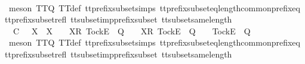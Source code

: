 \begin{isabellebody}
\ \ \ \ \ \ \isamarkupfalse%
\ {\isacharparenleft}meson\ TT{}{\isacharunderscore}Q\ TT{}{\isacharunderscore}def\ tt{\isacharunderscore}prefix{\isacharunderscore}subset{\isachardot}simps{\isacharparenleft}{}{\isacharparenright}\ tt{\isacharunderscore}prefix{\isacharunderscore}subset{\isacharunderscore}eq{\isacharunderscore}length{\isacharunderscore}common{\isacharunderscore}prefix{\isacharunderscore}eq\ tt{\isacharunderscore}prefix{\isacharunderscore}subset{\isacharunderscore}refl\ tt{\isacharunderscore}subset{\isacharunderscore}imp{\isacharunderscore}prefix{\isacharunderscore}subset\ tt{\isacharunderscore}subset{\isacharunderscore}same{\isacharunderscore}length{\isacharparenright}\isanewline
\ \ \isamarkupfalse%
\isanewline
\ \ \ \ \isamarkupfalse%
\ {\isachardoublequoteopen}{\isasymrho}{\isacharprime}\ {\isasymsubseteq}\isactrlsub C\ {\isasymrho}{\isacharprime}{\isacharprime}\ {\isasymLongrightarrow}\ X\ {\isasymsubseteq}\ X{\isacharprime}\ {\isasymLongrightarrow}\ {\isasymrho}{\isacharprime}{\isacharprime}\ {\isacharat}\ {\isacharbrackleft}{\isacharbrackleft}X{\isacharprime}{\isacharbrackright}\isactrlsub R{\isacharcomma}\ {\isacharbrackleft}Tock{\isacharbrackright}\isactrlsub E{\isacharbrackright}\ {\isasymin}\ Q\ {\isasymLongrightarrow}\ {\isasymrho}{\isacharprime}\ {\isacharat}\ {\isacharbrackleft}{\isacharbrackleft}X{\isacharbrackright}\isactrlsub R{\isacharcomma}\ {\isacharbrackleft}Tock{\isacharbrackright}\isactrlsub E{\isacharbrackright}\ {\isasymnotin}\ Q\ {\isasymLongrightarrow}\ {\isasymrho}{\isacharprime}\ {\isacharat}\ {\isacharbrackleft}{\isacharbrackleft}Tock{\isacharbrackright}\isactrlsub E{\isacharbrackright}\ {\isasymin}\ Q{\isachardoublequoteclose}\isanewline
\ \ \ \ \ \ \isamarkupfalse%
\ {\isacharparenleft}meson\ TT{}{\isacharunderscore}Q\ TT{}{\isacharunderscore}def\ tt{\isacharunderscore}prefix{\isacharunderscore}subset{\isachardot}simps{\isacharparenleft}{}{\isacharparenright}\ tt{\isacharunderscore}prefix{\isacharunderscore}subset{\isacharunderscore}eq{\isacharunderscore}length{\isacharunderscore}common{\isacharunderscore}prefix{\isacharunderscore}eq\ tt{\isacharunderscore}prefix{\isacharunderscore}subset{\isacharunderscore}refl\ tt{\isacharunderscore}subset{\isacharunderscore}imp{\isacharunderscore}prefix{\isacharunderscore}subset\ tt{\isacharunderscore}subset{\isacharunderscore}same{\isacharunderscore}length{\isacharparenright}\isanewline
\ \ \isamarkupfalse%
\isanewline
\ \ \isamarkupfalse%

\end{isabellebody}
